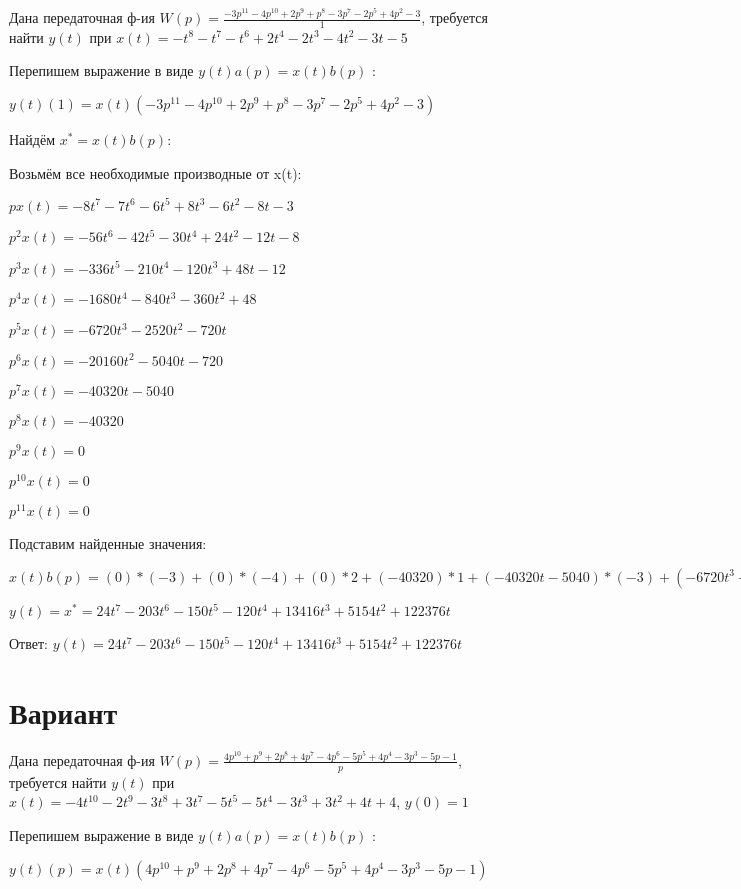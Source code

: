 \documentclass{article}
\begin{document}
{{{{{{Дана передаточная ф-ия $W(p)=\frac{-3p^{11}-4p^{10}+2p^{9}+p^{8}-3p^{7}-2p^{5}+4p^{2}-3}{1}$, требуется найти $y(t)$ при $x(t)=-t^{8}-t^{7}-t^{6}+2t^{4}-2t^{3}-4t^{2}-3t-5$

Перепишем выражение в виде $y(t)a(p)=x(t)b(p)$ :

$y(t)(1)=x(t)(-3p^{11}-4p^{10}+2p^{9}+p^{8}-3p^{7}-2p^{5}+4p^{2}-3)$

Найдём $x^*=x(t)b(p)$:

Возьмём все необходимые производные от x(t):

$px(t)=-8t^{7}-7t^{6}-6t^{5}+8t^{3}-6t^{2}-8t-3$

$p^2x(t)=-56t^{6}-42t^{5}-30t^{4}+24t^{2}-12t-8$

$p^3x(t)=-336t^{5}-210t^{4}-120t^{3}+48t-12$

$p^4x(t)=-1680t^{4}-840t^{3}-360t^{2}+48$

$p^5x(t)=-6720t^{3}-2520t^{2}-720t$

$p^6x(t)=-20160t^{2}-5040t-720$

$p^7x(t)=-40320t-5040$

$p^8x(t)=-40320$

$p^9x(t)=0$

$p^10x(t)=0$

$p^11x(t)=0$

Подставим найденные значения:

$x(t)b(p) = (0)*(-3)+(0)*(-4)+(0)*2+(-40320)*1+(-40320t-5040)*(-3)+(-6720t^{3}-2520t^{2}-720t)*(-2)+(-56t^{6}-42t^{5}-30t^{4}+24t^{2}-12t-8)*4+(-8t^{7}-7t^{6}-6t^{5}+8t^{3}-6t^{2}-8t-3)*(-3)=24t^{7}-203t^{6}-150t^{5}-120t^{4}+13416t^{3}+5154t^{2}+122376t$





$y(t)=x^*=24t^{7}-203t^{6}-150t^{5}-120t^{4}+13416t^{3}+5154t^{2}+122376t$

Ответ: $y(t) = 24t^{7}-203t^{6}-150t^{5}-120t^{4}+13416t^{3}+5154t^{2}+122376t$

\section{Вариант}

Дана передаточная ф-ия $W(p)=\frac{4p^{10}+p^{9}+2p^{8}+4p^{7}-4p^{6}-5p^{5}+4p^{4}-3p^{3}-5p-1}{p}$, требуется найти $y(t)$ при $x(t)=-4t^{10}-2t^{9}-3t^{8}+3t^{7}-5t^{5}-5t^{4}-3t^{3}+3t^{2}+4t+4$, $y(0)=1$

Перепишем выражение в виде $y(t)a(p)=x(t)b(p)$ :

$y(t)(p)=x(t)(4p^{10}+p^{9}+2p^{8}+4p^{7}-4p^{6}-5p^{5}+4p^{4}-3p^{3}-5p-1)$

}}}}}}
\end{document}
